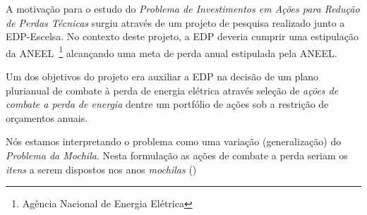\documentclass{article}
\begin{document}


A motivação para o estudo do \emph{Problema de Investimentos em Ações para
Redução de Perdas Técnicas} surgiu através de um projeto de pesquisa realizado
junto a EDP-Escelsa.
No contexto deste projeto, a EDP deveria cumprir uma estipulação da ANEEL~\footnote{
Agência Nacional de Energia Elétrica} alcançando uma meta de perda anual
estipulada pela ANEEL.

Um dos objetivos do projeto era auxiliar a EDP na
decisão de um plano plurianual de combate à perda de energia elétrica através
seleção de \emph{ações de combate a perda de energia} dentre um portfólio de
ações sob a restrição de orçamentos anuais.


Nós estamos interpretando o problema como uma variação (generalização) do
\emph{Problema da Mochila}.
Nesta formulação as ações de combate a perda seriam os \emph{itens} a serem
dispostos nos anos \textit{mochilas} ()



\end{document}
